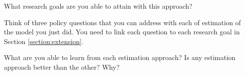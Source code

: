 \begin{exercise}
What research goals are you able to attain with this approach?
\end{exercise}

\begin{exercise}
Think of three policy questions that you can address with each of estimation of the model you just did. You need to link each question to each research goal in Section \ref{section:extension}.
\end{exercise}

\begin{exercise}
What are you able to learn from each estimation approach? Is any estimation approach better than the other? Why?
\end{exercise}